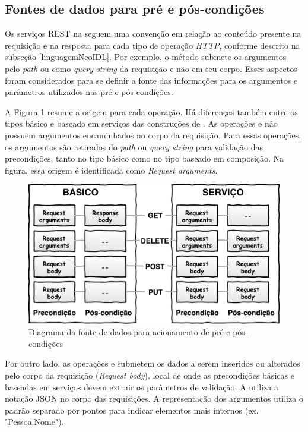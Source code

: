 \subsection{Fontes de dados para pré e pós-condições}
\label{FonteDadosDbc}

Os serviços REST na \neoidl{} seguem uma convenção em relação ao conteúdo
presente na requisição e na resposta para cada tipo de operação \emph{HTTP},
conforme descrito na subseção \ref{linguagemNeoIDL}. Por exemplo, o método 
submete os argumentos pelo \emph{path} ou como \textit{query string} da
requisição e não em seu corpo. Esses aspectos foram considerados para se definir
a fonte das informações para os argumentos e parâmetros utilizados nas pré e
pós-condições.

A Figura \ref{Fig:FonteDadosDbcNeoIDL} resume a origem para cada operação. Há
diferenças também entre os tipos básico e baseado em serviços das construções de
\designbycontract{}. As operações  e  não possuem
argumentos encaminhados no corpo da requisição. Para essas operações, os
argumentos são retirados do \emph{path} ou \emph{query string} para validação
das precondições, tanto no tipo básico como no tipo baseado em composição. Na
figura, essa origem é identificada como \textit{Request arguments}.

\begin{figure}[!htb]
\centering
\includegraphics[width=120mm,trim = 0mm 0mm 0mm
0mm,clip]{img/FonteDadosDbcNeoIDL.pdf}
\caption{Diagrama da fonte de dados para acionamento de pré e pós-condições}
\label{Fig:FonteDadosDbcNeoIDL}
\end{figure}


Por outro lado, as operações  e  submetem os dados a
serem inseridos ou alterados pelo corpo da requisição (\textit{Request body}),
local de onde as precondições básicas e baseadas em serviços devem extrair os
parâmetros de validação.
A \neoidl{} utiliza a notação JSON\cite{JSon} no corpo das requisições. A
representação dos argumentos utiliza o padrão separado por pontos para indicar
elementos mais internos (ex. "Pessoa.Nome").

